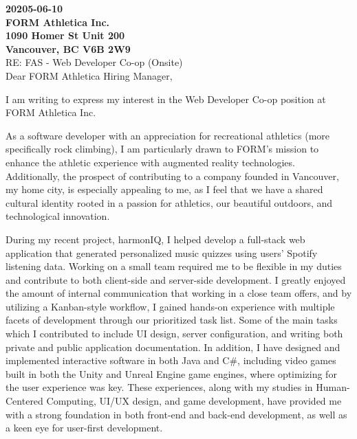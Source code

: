 \documentclass[10pt,a4paper,ragged2e,withhyper]{altacv}
\renewcommand{\personalinfofont}{\small\bfseries}
\begin{document}
\makecvheader

\vspace{1em}

{\personalinfofont
20205-06-10\\
FORM Athletica Inc.\\
1090 Homer St Unit 200\\
Vancouver, BC V6B 2W9\\

}
\vspace{1em}
RE: FAS - Web Developer Co-op (Onsite)\\
\vspace{1em}
Dear FORM Athletica Hiring Manager,\\

\vspace{1em}

I am writing to express my interest in the Web Developer Co-op position at FORM Athletica Inc. 

As a software developer with an appreciation for recreational athletics (more specifically rock climbing), I am particularly drawn to FORM’s mission to enhance the athletic experience with augmented reality technologies. Additionally, the prospect of contributing to a company founded in Vancouver, my home city, is especially appealing to me, as I feel that we have a shared cultural identity rooted in a passion for athletics, our beautiful outdoors, and technological innovation.

\vspace{1em}


During my recent project, harmonIQ, I helped develop a full-stack web application that generated personalized music quizzes using users’ Spotify listening data. Working on a small team required me to be flexible in my duties and contribute to both client-side and server-side development. I greatly enjoyed the amount of internal communication that working in a close team offers, and by utilizing a Kanban-style workflow, I gained hands-on experience with multiple facets of development through our prioritized task list. Some of the main tasks which I contributed to include UI design, server configuration, and writing both private and public application documentation. In addition, I have designed and implemented interactive software in both Java and C\#, including video games built in both the Unity and Unreal Engine game engines, where optimizing for the user experience was key. These experiences, along with my studies in Human-Centered Computing, UI/UX design, and game development, have provided me with a strong foundation in both front-end and back-end development, as well as a keen eye for user-first development.
\end{document}
